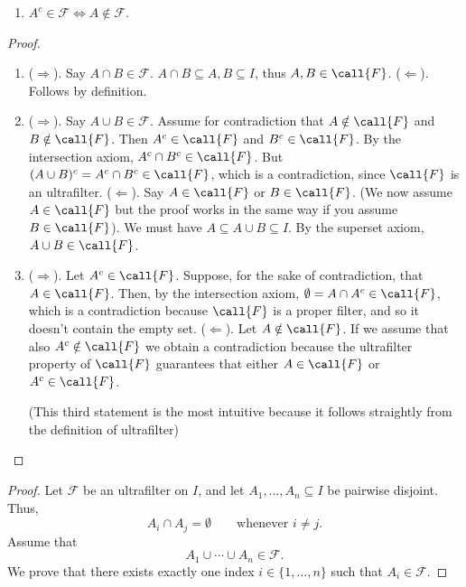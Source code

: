 {{\begin{enumerate}
    \item \(A^c \in \mathcal{F} \iff A \notin \mathcal{F}\).
\end{enumerate}
}
\begin{proof}
    \begin{enumerate}
        \item ($\Rightarrow$). Say $A \cap B \in \mathcal{F}$. $A \cap B \subseteq A, B \subseteq I$, thus $A, B \in \call{F}$. 
        \newline
        \noin ($\Leftarrow$). Follows by definition. 
        \item ($\Rightarrow$). Say $A \cup B \in \mathcal{F}$. Assume for contradiction that $A \notin \call{F}$ and $B \notin \call{F}$. Then $A^c \in \call{F}$ and $B^c \in \call{F}$. By the intersection axiom, $A^c\cap B^c \in \call{F}$. But $ (A\cup B)^c=A^c\cap B^c \in \call{F}$, which is a contradiction, since $\call{F}$ is an ultrafilter. 
        \newline
        \noin ($\Leftarrow$). Say $A \in \call{F}$ or $B \in \call{F}$. (We now assume $A \in \call{F}$ but the proof works in the same way if you assume $B \in \call{F}$). We must have $A \subseteq A \cup B \subseteq I$. By the superset axiom, $A \cup B \in \call{F}$.
        \item ($\Rightarrow$). Let $A^c \in \call{F}$. Suppose, for the sake of contradiction, that $A \in \call{F}$. Then, by the intersection axiom, $\emptyset=A\cap A^c\in \call{F}$, which is a contradiction because $\call{F}$ is a proper filter, and so it doesn't contain the empty set.
        \newline
        \noin ($\Leftarrow$). Let $A \notin \call{F}$. If we assume that also $A^c \notin \call{F}$ we obtain a contradiction because the ultrafilter property of $\call{F}$ guarantees that either $A \in \call{F}$ or $A^c \in \call{F}$. 

        (This third statement is the most intuitive because it follows straightly from the definition of ultrafilter)
    \end{enumerate}
\end{proof}

 \label{prop: in union of sets exactly one belongs to F}
\begin{proof}
Let $\mathcal{F}$ be an ultrafilter on $I$, and let
$A_1,\dots,A_n \subseteq I$ be pairwise disjoint. Thus,
\[
A_i \cap A_j = \emptyset
\qquad \text{whenever } i \neq j.
\]
Assume that
\[
A_1 \cup \cdots \cup A_n \in \mathcal{F}.
\]
We prove that there exists exactly one index
$i \in \{1,\dots,n\}$ such that $A_i \in \mathcal{F}$.


\end{proof}}
